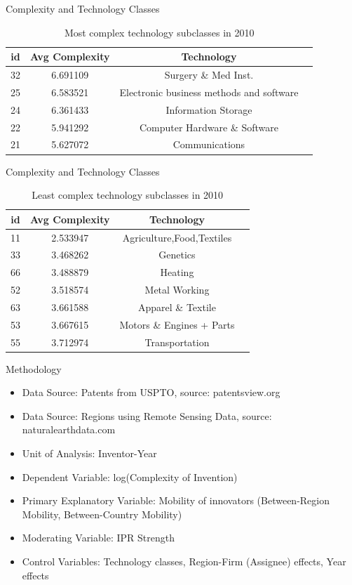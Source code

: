 \documentclass{beamer}
\begin{document}
\begin{frame}{Complexity and Technology Classes}
\begin{table}[htbp]\centering \caption{Most complex technology subclasses in 2010 \label{sumstat}}
\begin{tabular}{l c c  c}\hline\hline
\multicolumn{1}{c}{\textbf{id}} & \textbf{Avg Complexity} & \textbf{Technology} \\ \hline
32	&6.691109	&Surgery \& Med Inst.\\
25	&6.583521	&Electronic business methods and software\\
24	&6.361433	&Information Storage\\
22	&5.941292	&Computer Hardware \& Software\\
21	&5.627072	&Communications\\
\hline
\end{tabular}
\end{table}
\end{frame}		

\begin{frame}{Complexity and Technology Classes}		
\begin{table}[htbp]\centering \caption{Least complex technology subclasses in 2010 \label{sumstat}}
\begin{tabular}{l c c  c}\hline\hline
\multicolumn{1}{c}{\textbf{id}} & \textbf{Avg Complexity} & \textbf{Technology} \\ \hline
11	&2.533947	&Agriculture,Food,Textiles\\
33	&3.468262	&Genetics\\
66	&3.488879	&Heating\\
52	&3.518574	&Metal Working\\
63	&3.661588	&Apparel \& Textile\\
53	&3.667615	&Motors \& Engines + Parts\\
55	&3.712974	&Transportation\\
\hline
\end{tabular}
\end{table}
\end{frame}

\begin{frame}{Methodology}{}
\begin{itemize}
\item{Data Source: Patents from USPTO, source: patentsview.org}
\item{Data Source: Regions using Remote Sensing Data, source: naturalearthdata.com}
\item{Unit of Analysis: Inventor-Year}
\item{Dependent Variable: log(Complexity of Invention)}
\item{Primary Explanatory Variable: Mobility of innovators (Between-Region Mobility, Between-Country Mobility)}
\item{Moderating Variable: IPR Strength }
\item{Control Variables: Technology classes, Region-Firm (Assignee) effects, Year effects}
\end{itemize}
\end{frame}
\end{document}
